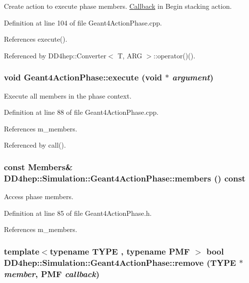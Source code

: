 Create action to execute phase members. \hyperlink{class_d_d4hep_1_1_callback}{Callback} in Begin stacking action. 

Definition at line 104 of file Geant4ActionPhase.cpp.

References execute().

Referenced by DD4hep::Converter$<$ T, ARG $>$::operator()().\hypertarget{class_d_d4hep_1_1_simulation_1_1_geant4_action_phase_a69f90116c5b2b689cf25e88e0a9f90e7}{
\subsubsection[{execute}]{\setlength{\rightskip}{0pt plus 5cm}void Geant4ActionPhase::execute (void $\ast$ {\em argument})}}
\label{class_d_d4hep_1_1_simulation_1_1_geant4_action_phase_a69f90116c5b2b689cf25e88e0a9f90e7}


Execute all members in the phase context. 

Definition at line 88 of file Geant4ActionPhase.cpp.

References m\_\-members.

Referenced by call().\hypertarget{class_d_d4hep_1_1_simulation_1_1_geant4_action_phase_a350be3254b4fd82068c18fec6381491e}{
\subsubsection[{members}]{\setlength{\rightskip}{0pt plus 5cm}const {\bf Members}\& DD4hep::Simulation::Geant4ActionPhase::members () const}}
\label{class_d_d4hep_1_1_simulation_1_1_geant4_action_phase_a350be3254b4fd82068c18fec6381491e}


Access phase members. 

Definition at line 85 of file Geant4ActionPhase.h.

References m\_\-members.\hypertarget{class_d_d4hep_1_1_simulation_1_1_geant4_action_phase_a9759c4205f62d091a35f4fc628ea2847}{
\subsubsection[{remove}]{\setlength{\rightskip}{0pt plus 5cm}template$<$typename TYPE , typename PMF $>$ bool DD4hep::Simulation::Geant4ActionPhase::remove (TYPE $\ast$ {\em member}, \/  PMF {\em callback})}}
\label{class_d_d4hep_1_1_simulation_1_1_geant4_action_phase_a9759c4205f62d091a35f4fc628ea2847}


